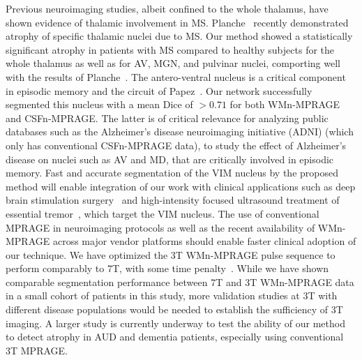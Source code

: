 Previous neuroimaging studies, albeit confined to the whole thalamus, have shown evidence of thalamic involvement in MS\@. Planche~\cite{planche_Whitematternulled_2019} recently demonstrated atrophy of specific thalamic nuclei due to MS\@. Our method showed a statistically significant atrophy in patients with MS compared to healthy subjects for the whole thalamus as well as for AV, MGN, and pulvinar nuclei, comporting well with the results of Planche~\cite{planche_Whitematternulled_2019}. The antero-ventral nucleus is a critical component in episodic memory and the circuit of Papez~\cite{1921968:27964329}. Our network successfully segmented this nucleus with a mean Dice of $ > 0.71$ for both WMn-MPRAGE and CSFn-MPRAGE\@. The latter is of critical relevance for analyzing public databases such as the Alzheimer's disease neuroimaging initiative (ADNI) (which only has conventional CSFn-MPRAGE data), to study the effect of Alzheimer's disease on nuclei such as AV and MD, that are critically involved in episodic memory. Fast and accurate segmentation of the VIM nucleus by the proposed method will enable integration of our work with clinical applications such as deep brain stimulation surgery~\cite{brodkey_Tremor_2004,benabid_Chronic_1996,fama_Thalamic_2015} and high-intensity focused ultrasound treatment of essential tremor~\cite{1921968:27964369}, which target the VIM nucleus. The use of conventional MPRAGE in neuroimaging protocols as well as the recent availability of WMn-MPRAGE across major vendor platforms should enable faster clinical adoption of our technique. We have optimized the 3T WMn-MPRAGE pulse sequence to perform comparably to 7T, with some time penalty~\cite{1921968:27964319}. While we have shown comparable segmentation performance between 7T and 3T WMn-MPRAGE data in a small cohort of patients in this study, more validation studies at 3T with different disease populations would be needed to establish the sufficiency of 3T imaging. A larger study is currently underway to test the ability of our method to detect atrophy in AUD and dementia patients, especially using conventional 3T MPRAGE\@.


